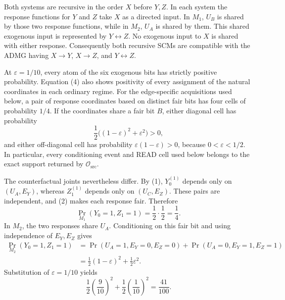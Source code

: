 Both systems are recursive in the order \(X\) before \(Y,Z\).  In each system the response functions for \(Y\) and \(Z\) take \(X\) as a directed input.  In \(M_1\), \(U_B\) is shared by those two response functions, while in \(M_2\), \(U_A\) is shared by them.  This shared exogenous input is represented by \(Y\leftrightarrow Z\).  No exogenous input to \(X\) is shared with either response.  Consequently both recursive SCMs are compatible with the ADMG having \(X\to Y\), \(X\to Z\), and \(Y\leftrightarrow Z\).

At \(\varepsilon=1/10\), every atom of the six exogenous bits has strictly positive probability.  Equation (4) also shows positivity of every assignment of the natural coordinates in each ordinary regime.  For the edge-specific acquisitions used below, a pair of response coordinates based on distinct fair bits has four cells of probability \(1/4\).  If the coordinates share a fair bit \(B\), either diagonal cell has probability
\[
 \frac12\bigl((1-\varepsilon)^2+\varepsilon^2\bigr)>0,
\]
and either off-diagonal cell has probability \(\varepsilon(1-\varepsilon)>0\), because \(0<\varepsilon<1/2\).  In particular, every conditioning event and READ cell used below belongs to the exact support returned by \(\mathcal O_{\mathrm{src}}\).

The counterfactual joints nevertheless differ.  By (1), \(Y_0^{(1)}\) depends only on \((U_A,E_Y)\), whereas \(Z_1^{(1)}\) depends only on \((U_C,E_Z)\).  These pairs are independent, and (2) makes each response fair.  Therefore
\[
 \Pr_{M_1}(Y_0=1,Z_1=1)=\frac12\cdot\frac12=\frac14.
\tag{5}
\]
In \(M_2\), the two responses share \(U_A\).  Conditioning on this fair bit and using independence of \(E_Y,E_Z\) gives
\[
\begin{aligned}
 \Pr_{M_2}(Y_0=1,Z_1=1)
 &=\Pr(U_A=1,E_Y=0,E_Z=0)
   +\Pr(U_A=0,E_Y=1,E_Z=1)\\
 &=\frac12(1-\varepsilon)^2+\frac12\varepsilon^2.
\end{aligned}
\tag{6}
\]
Substitution of \(\varepsilon=1/10\) yields
\[
 \frac12\left(\frac9{10}\right)^2+
 \frac12\left(\frac1{10}\right)^2
 =\frac{41}{100}.
\tag{7}
\]

